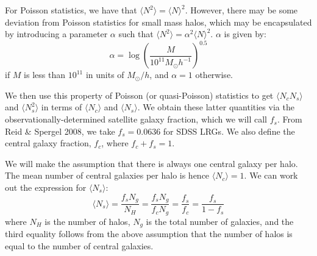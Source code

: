 \documentclass[onecolumn,amsmath,aps,fleqn, superscriptaddress]{revtex4}
\begin{document}
For Poisson statistics, we have that $\langle N^2 \rangle = \langle N \rangle^2$. However, there may be some deviation from Poisson statistics for small mass halos, which may be encapsulated by introducing a parameter $\alpha$ such that $\langle N^2 \rangle = \alpha^2\langle N \rangle^2$. $\alpha$ is given by:
\begin{equation}
\alpha = \log\left(\frac{M}{10^{11}M_\odot h^{-1}}\right)^{0.5}
\label{alpha}
\end{equation}
if $M$ is less than $10^{11}$ in units of $M_\odot / h$, and $\alpha=1$ otherwise. 

We then use this property of Poisson (or quasi-Poisson) statistics to get $\langle N_c N_s \rangle$ and $\langle N_s^2 \rangle$ in terms of $\langle N_c \rangle$ and $\langle N_s \rangle$. We obtain these latter quantities via the observationally-determined satellite galaxy fraction, which we will call $f_s$. From Reid \& Spergel 2008, we take $f_s = 0.0636$ for SDSS LRGs. We also define the central galaxy fraction, $f_c$, where $f_c + f_s=1$. 

We will make the assumption that there is always one central galaxy per halo. The mean number of central galaxies per halo is hence $\langle N_c \rangle=1$. We can work out the expression for $\langle N_s \rangle$:
\begin{equation}
\langle N_s \rangle = \frac{f_s N_g}{N_H} = \frac{f_s N_g}{f_c N_g} = \frac{f_s}{f_c} = \frac{f_s}{1-f_s}
\label{Nsmean}
\end{equation}
where $N_H$ is the number of halos, $N_g$ is the total number of galaxies, and the third equality follows from the above assumption that the number of halos is equal to the number of central galaxies.
\end{document}
